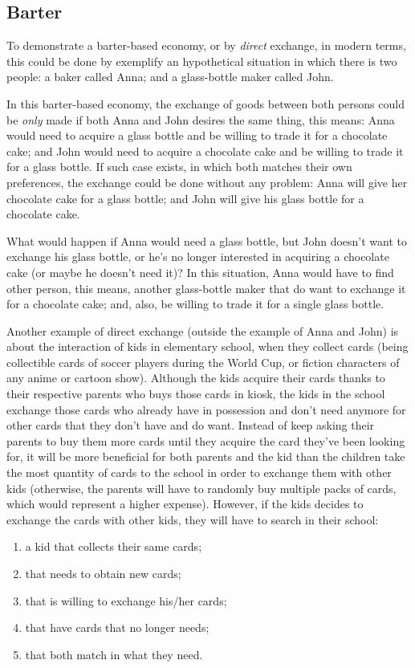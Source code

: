 \documentclass[12pt,a4paper,twoside]{book}
\begin{document}
\subsection{Barter}
To demonstrate a barter-based economy, or by \textit{direct} exchange, in modern terms, this could be done by exemplify an hypothetical situation in which there is two people: a baker called Anna; and a glass-bottle maker called John.

In this barter-based economy, the exchange of goods between both persons could be \textit{only} made if both Anna and John desires the same thing, this means: Anna would need to acquire a glass bottle and be willing to trade it for a chocolate cake; and John would need to acquire a chocolate cake and be willing to trade it for a glass bottle. If such case exists, in which both matches their own preferences, the exchange could be done without any problem: Anna will give her chocolate cake for a glass bottle; and John will give his glass bottle for a chocolate cake.

What would happen if Anna would need a glass bottle, but John doesn't want to exchange his glass bottle, or he's no longer interested in acquiring a chocolate cake (or maybe he doesn't need it)? In this situation, Anna would have to find other person, this means, another glass-bottle maker that do want to exchange it for a chocolate cake; and, also, be willing to trade it for a single glass bottle.

Another example of direct exchange (outside the example of Anna and John) is about the interaction of kids in elementary school, when they collect cards (being collectible cards of soccer players during the World Cup, or fiction characters of any anime or cartoon show). Although the kids acquire their cards thanks to their respective parents who buys those cards in kiosk, the kids in the school exchange those cards who already have in possession and don't need anymore for other cards that they don't have and do want. Instead of keep asking their parents to buy them more cards until they acquire the card they've been looking for, it will be more beneficial for both parents and the kid than the children take the most quantity of cards to the school in order to exchange them with other kids (otherwise, the parents will have to randomly buy multiple packs of cards, which would represent a higher expense). However, if the kids decides to exchange the cards with other kids, they will have to search in their school:

\begin{enumerate}
\item a kid that collects their same cards;
\item that needs to obtain new cards;
\item that is willing to exchange his/her cards;
\item that have cards that no longer needs;
\item that both match in what they need.
\end{enumerate}
\end{document}
